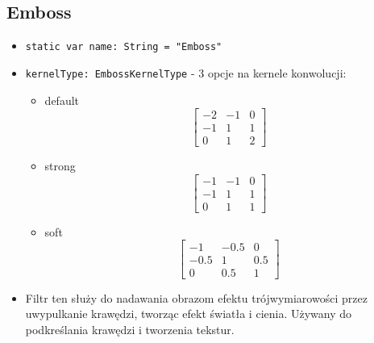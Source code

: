 \documentclass[a4paper]{article}
\begin{document}
\subsection{Emboss}

\begin{itemize}
    \item \texttt{static var name: String = "Emboss"}
    \item \texttt{kernelType: EmbossKernelType} - 3 opcje na kernele konwolucji:
          \begin{itemize}
              \item default
                    \[
                        \begin{bmatrix}
                            -2 & -1 & 0 \\
                            -1 & 1  & 1 \\
                            0  & 1  & 2
                        \end{bmatrix}
                    \]
              \item strong
                    \[
                        \begin{bmatrix}
                            -1 & -1 & 0 \\
                            -1 & 1  & 1 \\
                            0  & 1  & 1
                        \end{bmatrix}
                    \]
              \item soft
                    \[
                        \begin{bmatrix}
                            -1   & -0.5 & 0   \\
                            -0.5 & 1    & 0.5 \\
                            0    & 0.5  & 1
                        \end{bmatrix}
                    \]
          \end{itemize}
    \item Filtr ten służy do nadawania obrazom efektu trójwymiarowości przez uwypulkanie krawędzi, tworząc efekt światła i cienia. Używany do podkreślania krawędzi i tworzenia tekstur.
\end{itemize}
\end{document}
